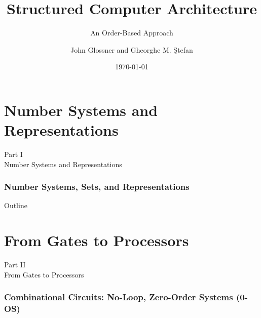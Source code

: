 \documentclass[aspectratio=169,11pt]{beamer}
\title[Part 1: Number Systems]{Structured Computer Architecture}
\subtitle{An Order-Based Approach}
\author{John Glossner and Gheorghe M. Ştefan}
\date{\today}
\begin{document}
\begin{frame}
\titlepage
\end{frame}

\part{Number Systems and Representations}

\begin{frame}
\begin{center}
{\Huge Part I}\\[0.5cm]
{\Large Number Systems and Representations}\\[0.5cm]
\end{center}
\end{frame}

\section{Number Systems, Sets, and Representations}
\begin{frame}{Outline}
\tableofcontents[sections=1]
\end{frame}


\part{From Gates to Processors}

\begin{frame}
\begin{center}
{\Huge Part II}\\[0.5cm]
{\Large From Gates to Processors}\\[0.5cm]
\end{center}
\end{frame}

\section{Combinational Circuits: No-Loop, Zero-Order Systems (0-OS)}
\end{document}
